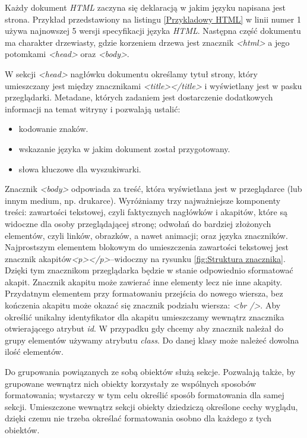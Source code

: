 \documentclass{iiuwb}
\begin{document}
Każdy dokument \textit{HTML} zaczyna się deklaracją w jakim języku napisana jest strona. Przykład przedstawiony na listingu \ref{Przykladowy HTML} w linii numer 1 używa najnowszej 5 wersji specyfikacji języka \textit{HTML}. Następna część dokumentu ma charakter drzewiasty, gdzie korzeniem drzewa jest znacznik \textit{<html>} a jego potomkami \textit{<head>} oraz \textit{<body>}.

W sekcji \textit{<head>} nagłówku dokumentu określamy tytuł strony, który umieszczany jest między znacznikami \textit{<title></title>} i wyświetlany jest w pasku przeglądarki. Metadane, których zadaniem jest dostarczenie dodatkowych informacji na temat witryny i pozwalają ustalić:

\begin{itemize}
\item kodowanie znaków.
\item wskazanie języka w jakim dokument został przygotowany.
\item słowa kluczowe dla wyszukiwarki.
\end{itemize}

Znacznik \textit{<body>} odpowiada za treść, która wyświetlana jest w przeglądarce (lub innym medium, np. drukarce). Wyróżniamy trzy najważniejsze komponenty treści: zawartości tekstowej, czyli faktycznych nagłówków i akapitów, które są widoczne dla osoby przeglądającej stronę; odwołań do bardziej złożonych elementów, czyli linków, obrazków, a nawet animacji; oraz języka znaczników. Najprostszym elementem blokowym do umieszczenia zawartości tekstowej jest znacznik akapitów\textit{<p></p>}--widoczny na rysunku \ref{fig:Struktura znacznika}. Dzięki tym znacznikom przeglądarka będzie w stanie odpowiednio sformatować akapit. Znacznik akapitu może zawierać inne elementy lecz nie inne akapity. Przydatnym elementem przy formatowaniu przejścia do nowego wiersza, bez kończenia akapitu może okazać się znacznik podziału wiersza: \textit{<br />}. Aby określić unikalny identyfikator dla akapitu umieszczamy wewnątrz znacznika otwierającego atrybut \textit{id}. W przypadku gdy chcemy aby znacznik należał do grupy elementów używamy atrybutu \textit{class}. Do danej klasy może należeć dowolna ilość elementów.

Do grupowania powiązanych ze sobą obiektów służą sekcje. Pozwalają także, by grupowane wewnątrz nich obiekty korzystały ze wspólnych sposobów formatowania; wystarczy w tym celu określić sposób formatowania dla samej sekcji. Umieszczone wewnątrz sekcji obiekty dziedziczą określone cechy wyglądu, dzięki czemu nie trzeba określać formatowania osobno dla każdego z tych obiektów. 
\end{document}
